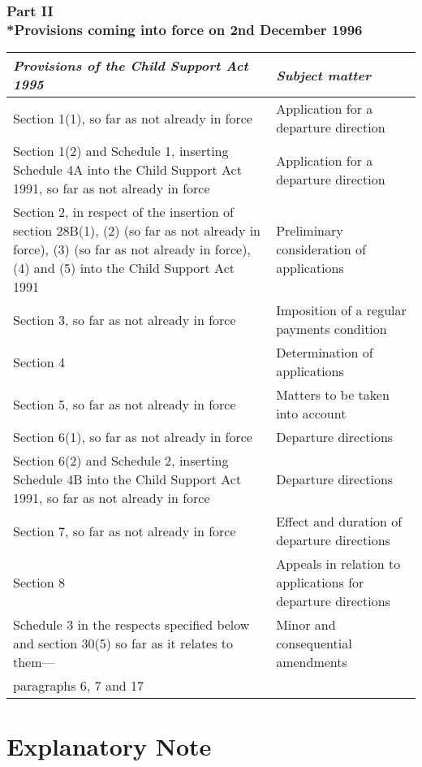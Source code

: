 \documentclass[a4paper]{article}
\newcommand{\parthead}{}
\begin{document}
\section[Part II --- Provisions coming into force on 2nd December 1996]{Part II\\*Provisions coming into force on 2nd December 1996}

\renewcommand\parthead{--- Schedule Part II}

\begin{longtable}{p{231.28306pt}p{89.71594pt}}
\hline
\itshape Provisions of the Child Support Act 1995 & \itshape Subject matter\\
\hline
\endhead
\hline
\endlastfoot
Section 1(1), so far as not already in force&Application for a departure direction\\
Section 1(2) and Schedule 1, inserting Schedule 4A into the Child Support Act 1991, so far as not already in force&Application for a departure direction\\
Section 2, in respect of the insertion of section 28B(1), (2) (so far as not already in force), (3) (so far as not already in force), (4) and (5) into the Child Support Act 1991&Preliminary consideration of applications\\
Section 3, so far as not already in force&Imposition of a regular payments condition\\
Section 4&Determination of applications\\
Section 5, so far as not already in force&Matters to be taken into account\\
Section 6(1), so far as not already in force&Departure directions\\
Section 6(2) and Schedule 2, inserting Schedule 4B into the Child Support Act 1991, so far as not already in force&Departure directions\\
Section 7, so far as not already in force&Effect and duration of departure directions\\
Section 8&Appeals in relation to applications for departure directions\\
Schedule 3 in the respects specified below and section 30(5) so far as it relates to them—&Minor and consequential amendments\\
\hspace{1em} paragraphs 6, 7 and 17\\
\end{longtable}

\part{Explanatory Note}
\end{document}
